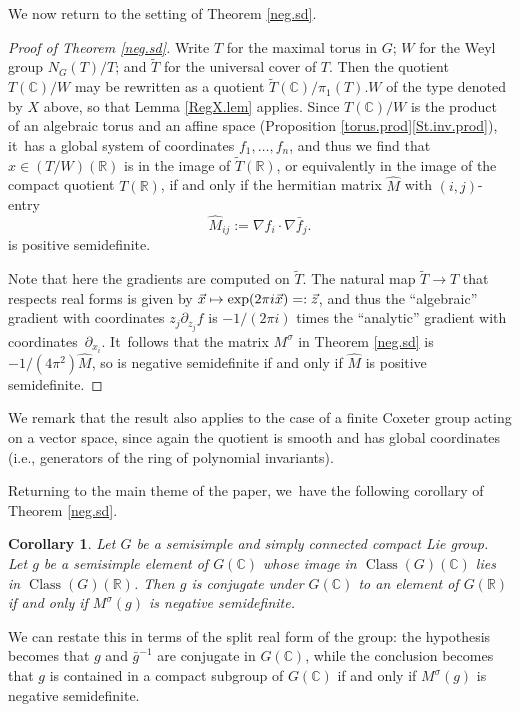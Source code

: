 \documentclass[JEP,XML,SOM,Unicode,NoFloatCountersInSection,published]{cedram}
\newcommand\mto{\mathchoice{\longmapsto}{\mapsto}{\mapsto}{\mapsto}}
\newtheorem{cor}[equation]{Corollary}
\theoremstyle{definition}
\newcommand{\R}{\mathbb{R}}
\newcommand{\C}{\mathbb{C}}
\DeclareMathOperator{\class}{Class}
\newcommand{\ClG}{\class(G)}
\newcommand{\Mh}{\hat{M}}
\newcommand{\Tt}{\tilde{T}}
\begin{document}
We now return to the setting of Theorem \ref{neg.sd}.

\begin{proof}[Proof of Theorem \ref{neg.sd}]
Write $T$ for the maximal torus in $G$; $W$ for the Weyl group $N_G(T)/T$; and $\Tt$ for the universal cover of $T$.
Then the quotient $T(\C)/W$ may be
rewritten as a quotient $\Tt(\C)/\pi_1(T).W$ of the type denoted by $X$ above, so
that Lemma \ref{RegX.lem} applies. Since $T(\C)/W$ is the product of an
algebraic torus and an affine space (Proposition \ref{torus.prod}\eqref{St.inv.prod}), it~has a global system of
coordinates $f_1,\dots,f_n$, and thus we find that $x\in (T/W)(\R)$ is
in the image of $\Tt(\R)$, or equivalently in the image of the
compact quotient $T(\R)$, if and only if the hermitian matrix $\Mh$ with $(i,j)$-entry
\[
\Mh_{ij}:=\nabla f_i\cdot \nabla \bar{f}_j.
\]
is positive semidefinite.

Note that here the gradients are computed on $\Tt$. The natural map $\Tt\to T$ that respects real forms is given by $\vec{x}\mto \exp(2\pi i\vec{x})=:\vec{z}$, and thus the ``algebraic'' gradient with coordinates $z_j\partial_{z_j}f$ is $-1/(2\pi i)$ times the ``analytic'' gradient with coordinates~$\partial_{x_i}$. It~follows that the matrix $M^\sigma$ in Theorem \ref{neg.sd} is $-1/(4\pi^2) \Mh$, so is negative semidefinite if and only if $\Mh$ is positive semidefinite.
\end{proof}

We remark that the result also applies to the case
of a finite Coxeter group acting on a vector space, since again the
quotient is smooth and has global coordinates (i.e., generators of the
ring of polynomial invariants).

Returning to the main theme of the paper, we~have the following corollary of Theorem \ref{neg.sd}.

\begin{cor} \label{neg.G}
Let $G$ be a semisimple and simply connected compact Lie group. Let $g$ be a semisimple element of $G(\C)$ whose image in $\ClG(\C)$ lies in $\ClG(\R)$. Then $g$ is conjugate under $G(\C)$ to an element of $G(\R)$ if and only if $M^\sigma(g)$ is negative semidefinite.
\end{cor}

We can restate this in terms of the split real form of the group: the
hypothesis becomes that $g$ and $\bar{g}^{-1}$ are conjugate in $G(\C)$,
while the conclusion becomes that $g$ is contained in a compact subgroup of
$G(\C)$ if and only if $M^\sigma(g)$ is negative semidefinite.
\end{document}
